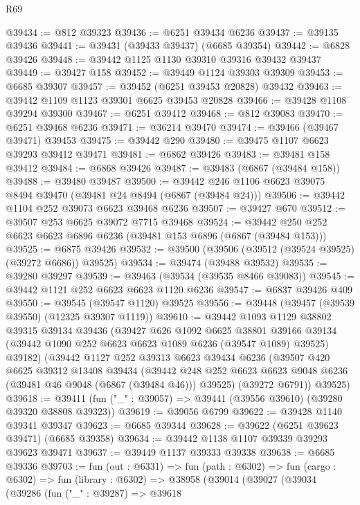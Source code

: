 \begin{lexlean}{R69}
\begin{coremodule}
{@39434 := @812 @39323
@39436 := @6251 @39434 @6236
@39437 := @39135 @39436
@39441 := @39431 (@39433 @39437) (@6685 @39354)
@39442 := @6828 @39426
@39448 := @39442 @1125 @1130 @39310 @39316 @39432 @39437
@39449 := @39427 @158
@39452 := @39449 @1124 @39303 @39309
@39453 := @6685 @39307
@39457 := @39452 (@6251 @39453 @20828) @39432
@39463 := @39442 @1109 @1123 @39301 @6625 @39453 @20828
@39466 := @39428 @1108 @39294 @39300
@39467 := @6251 @39412
@39468 := @812 @39083
@39470 := @6251 @39468 @6236
@39471 := @36214 @39470
@39474 := @39466 (@39467 @39471) @39453
@39475 := @39442 @290
@39480 := @39475 @1107 @6623 @39293 @39412 @39471
@39481 := @6862 @39426
@39483 := @39481 @158 @39412
@39484 := @6868 @39426
@39487 := @39483 (@6867 (@39484 @158))
@39488 := @39480 @39487
@39500 := @39442 @246 @1106 @6623 @39075 @8494 @39470 (@39481 @24 @8494 (@6867 (@39484 @24)))
@39506 := @39442 @1104 @252 @39073 @6623 @39468 @6236
@39507 := @39427 @670
@39512 := @39507 @253 @6625 @39072 @7715 @39468
@39524 := @39442 @250 @252 @6623 @6623 @6896 @6236 (@39481 @153 @6896 (@6867 (@39484 @153)))
@39525 := @6875 @39426
@39532 := @39500 (@39506 (@39512 (@39524 @39525) (@39272 @6686)) @39525)
@39534 := @39474 (@39488 @39532)
@39535 := @39280 @39297
@39539 := @39463 (@39534 (@39535 @8466 @39083))
@39545 := @39442 @1121 @252 @6623 @6623 @1120 @6236
@39547 := @6837 @39426 @409
@39550 := @39545 (@39547 @1120) @39525
@39556 := @39448 (@39457 (@39539 @39550) (@12325 @39307 @1119))
@39610 := @39442
    @1093
    @1129
    @38802
    @39315
    @39134
    @39436
    (@39427
      @626
      @1092
      @6625
      @38801
      @39166
      @39134
      (@39442 @1090 @252 @6623 @6623 @1089 @6236 (@39547 @1089) @39525)
      @39182)
    (@39442
      @1127
      @252
      @39313
      @6623
      @39434
      @6236
      (@39507
        @420
        @6625
        @39312
        @13408
        @39434
        (@39442 @248 @252 @6623 @6623 @9048 @6236 (@39481 @46 @9048 (@6867 (@39484 @46))) @39525)
        (@39272 @6791))
      @39525)
@39618 := @39411 (fun ("_" : @39057) => @39441 (@39556 @39610) (@39280 @39320 @38808 @39323))
@39619 := @39056 @6799
@39622 := @39428 @1140 @39341 @39347
@39623 := @6685 @39344
@39628 := @39622 (@6251 @39623 @39471) (@6685 @39358)
@39634 := @39442 @1138 @1107 @39339 @39293 @39623 @39471
@39637 := @39449 @1137 @39333 @39338
@39638 := @6685 @39336
@39703 := fun (out : @6331) =>
  fun (path : @6302) =>
  fun (cargo : @6302) =>
  fun (library : @6302) =>
  @38958
    (@39014
      (@39027
        (@39034
          (@39286
            (fun ("_" : @39287) =>
            @39618
}
\end{coremodule}
\end{lexlean}
